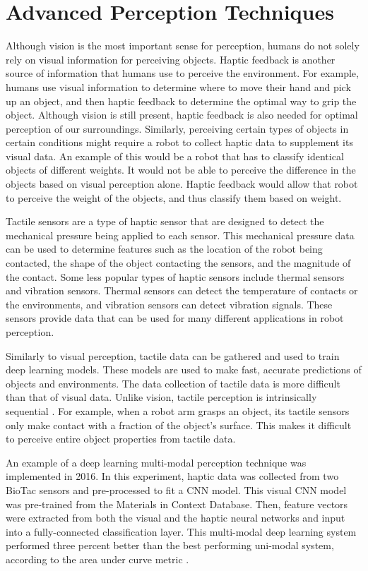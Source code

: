 \documentclass[conference]{IEEEtran}
\begin{document}
\section{Advanced Perception Techniques}
Although vision is the most important sense for perception, humans do not solely rely on visual information for perceiving objects. Haptic feedback is another source of information that humans use to perceive the environment. For example, humans use visual information to determine where to move their hand and pick up an object, and then haptic feedback to determine the optimal way to grip the object. Although vision is still present, haptic feedback is also needed for optimal perception of our surroundings. Similarly, perceiving certain types of objects in certain conditions might require a robot to collect haptic data to supplement its visual data. An example of this would be a robot that has to classify identical objects of different weights. It would not be able to perceive the difference in the objects based on visual perception alone. Haptic feedback would allow that robot to perceive the weight of the objects, and thus classify them based on weight.
\par
Tactile sensors are a type of haptic sensor that are designed to detect the mechanical pressure being applied to each sensor. This mechanical pressure data can be used to determine features such as the location of the robot being contacted, the shape of the object contacting the sensors, and the magnitude of the contact. Some less popular types of haptic sensors include thermal sensors and vibration sensors. Thermal sensors can detect the temperature of contacts or the environments, and vibration sensors can detect vibration signals. These sensors provide data that can be used for many different applications in robot perception.
\par
Similarly to visual perception, tactile data can be gathered and used to train deep learning models. These models are used to make fast, accurate predictions of objects and environments. The data collection of tactile data is more difficult than that of visual data. Unlike vision, tactile perception is intrinsically sequential \cite{navarro2023}. For example, when a robot arm grasps an object, its tactile sensors only make contact with a fraction of the object's surface. This makes it difficult to perceive entire object properties from tactile data.
\par
An example of a deep learning multi-modal perception technique was implemented in 2016. In this experiment, haptic data was collected from two BioTac sensors and pre-processed to fit a CNN model. This visual CNN model was pre-trained from the Materials in Context Database. Then, feature vectors were extracted from both the visual and the haptic neural networks and input into a fully-connected classification layer. This multi-modal deep learning system performed three percent better than the best performing uni-modal system, according to the area under curve metric \cite{navarro2023}.
\end{document}
